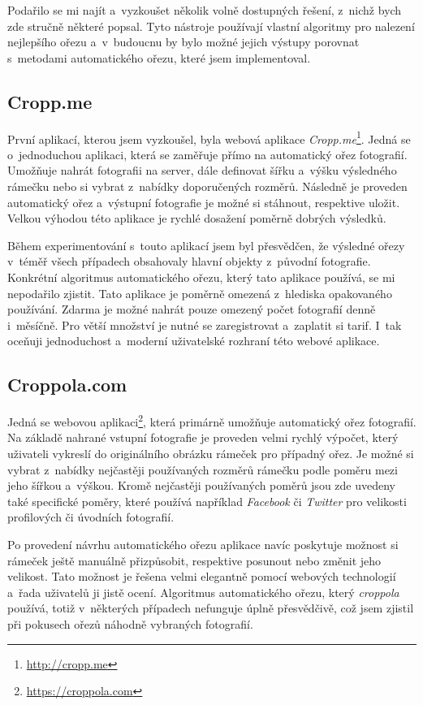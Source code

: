 Podařilo se mi najít a~vyzkoušet několik volně dostupných řešení, z~nichž bych zde stručně některé popsal. Tyto nástroje používají vlastní algoritmy pro nalezení nejlepšího ořezu a~v~budoucnu by bylo možné jejich výstupy porovnat s~metodami automatického ořezu, které jsem implementoval.

\subsection{Cropp.me}
První aplikací, kterou jsem vyzkoušel, byla webová aplikace \emph{Cropp.me}\footnote{\url{http://cropp.me}}. Jedná se o~jednoduchou aplikaci, která se zaměřuje přímo na automatický ořez fotografií. Umožňuje nahrát fotografii na server, dále definovat šířku a~výšku výsledného rámečku nebo si vybrat z~nabídky doporučených rozměrů. Následně je proveden automatický ořez a~výstupní fotografie je možné si stáhnout, respektive uložit. Velkou výhodou této aplikace je rychlé dosažení poměrně dobrých výsledků.

Během experimentování s~touto aplikací jsem byl přesvědčen, že výsledné ořezy v~téměř všech případech obsahovaly hlavní objekty z~původní fotografie. Konkrétní algoritmus automatického ořezu, který tato aplikace používá, se mi nepodařilo zjistit. Tato aplikace je poměrně omezená z~hlediska opakovaného používání. Zdarma je možné nahrát pouze omezený počet fotografií denně i~měsíčně. Pro větší množství je nutné se zaregistrovat a~zaplatit si tarif. I~tak oceňuji jednoduchost a~moderní uživatelské rozhraní této webové aplikace.

\subsection{Croppola.com}
Jedná se webovou aplikaci\footnote{\url{https://croppola.com}}, která primárně umožňuje automatický ořez fotografií. Na základě nahrané vstupní fotografie je proveden velmi rychlý výpočet, který uživateli vykreslí do originálního obrázku rámeček pro případný ořez. Je možné si vybrat z~nabídky nejčastěji používaných rozměrů rámečku podle poměru mezi jeho šířkou a~výškou. Kromě nejčastěji používaných poměrů jsou zde uvedeny také specifické poměry, které používá například \emph{Facebook} či \emph{Twitter} pro velikosti profilových či úvodních fotografií.

Po provedení návrhu automatického ořezu aplikace navíc poskytuje možnost si rámeček ještě manuálně přizpůsobit, respektive posunout nebo změnit jeho velikost. Tato možnost je řešena velmi elegantně pomocí webových technologií a~řada uživatelů ji jistě ocení. Algoritmus automatického ořezu, který \emph{croppola} používá, totiž v~některých případech nefunguje úplně přesvědčivě, což jsem zjistil při pokusech ořezů náhodně vybraných fotografií. 


